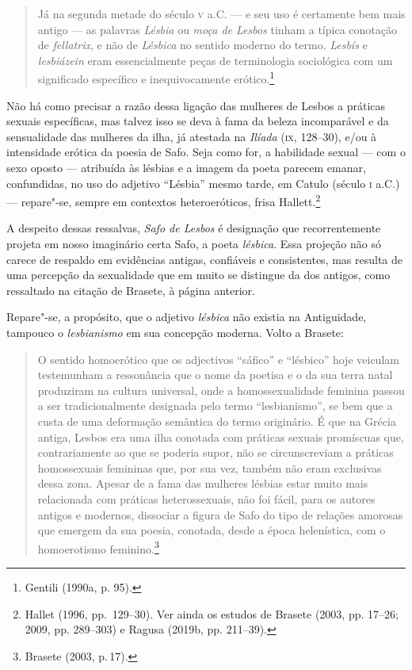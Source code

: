 \begin{quote}
Já na segunda metade do século \textsc{v} a.C. --- e seu uso é certamente bem mais antigo
--- as palavras \textit{Lésbia} ou \textit{moça de Lesbos} tinham a típica
conotação de \textit{fellatrix}, e não de \textit{Lésbica} no sentido moderno
do termo. \textit{Lesbís} e \textit{lesbiázein} eram essencialmente peças de
terminologia sociológica com um significado específico e inequivocamente
erótico.\footnote{ Gentili (1990a, p. 95).}
\end{quote}

Não há como precisar a razão dessa ligação das mulheres de Lesbos a práticas
sexuais específicas, mas talvez isso se deva à fama da beleza incomparável e da
sensualidade das mulheres da ilha, já atestada na \textit{Ilíada} (\textsc{ix}, 128--30),
e/ou à intensidade erótica da poesia de Safo. Seja como for, a habilidade
sexual --- com o sexo oposto --- atribuída às lésbias e a imagem da poeta parecem
emanar, confundidas, no uso do adjetivo “Lésbia” mesmo tarde, em Catulo
(século \textsc{i} a.C.) --- repare"-se, sempre em contextos heteroeróticos, frisa Hallett.\footnote{ Hallet 
(1996, pp.~129--30). Ver ainda os estudos de Brasete (2003, pp. 17--26; 2009, pp. 289--303) e Ragusa (2019b, pp. 211--39).} 

A despeito dessas ressalvas, \textit{Safo de Lesbos} é designação que
recorrentemente projeta em nosso imaginário certa Safo, a poeta
\textit{lésbica}. Essa projeção
não só carece de respaldo em evidências antigas,
confiáveis e consistentes, mas resulta de uma percepção da
sexualidade que em muito se distingue da dos antigos, como ressaltado na citação de Brasete, à página anterior.

Repare"-se, a propósito, que o adjetivo \textit{lésbica} não existia na
Antiguidade, tampouco o \textit{lesbianismo} em sua concepção moderna.
Volto a Brasete:

\begin{quote}
O sentido homoerótico que os adjectivos ``sáfico'' e ``lésbico'' hoje veiculam testemunham a ressonância que o nome da poetisa e o da sua terra natal produziram na cultura universal, onde a homossexualidade feminina passou a ser tradicionalmente designada pelo termo ``lesbianismo'', se bem que a custa de uma deformação semântica do termo originário. É que na Grécia antiga, Lesbos era uma ilha conotada com práticas sexuais promíscuas que, contrariamente ao que se poderia supor, não se circunscreviam a práticas homossexuais femininas que, por sua vez, também não eram exclusivas dessa zona. Apesar de a fama das mulheres lésbias estar muito mais relacionada com práticas heterossexuais, não foi fácil, para os autores antigos e modernos, dissociar a figura de Safo do tipo de relações amorosas que emergem da sua poesia, conotada, desde a época helenística, com o homoerotismo feminino.\footnote{Brasete (2003, p.\,17).}
\end{quote}

